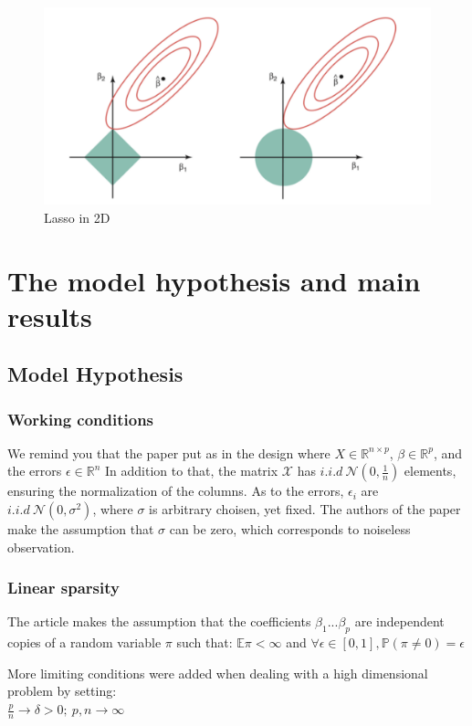 \documentclass[10pt,onecolumn,letterpaper]{article}
\begin{document}
\begin{figure}[!htbp]
   \begin{center}
	\includegraphics[width=0.5\linewidth]{lasso2d}
   \caption{Lasso in 2D}
   \label{fig:lasso}
   \end{center}
\end{figure}


\section{The model hypothesis and main results}

\subsection{Model Hypothesis }

\subsubsection{Working conditions}

We remind you that the paper put as in the design where $X \in \mathbb{R}^{n \times p}$, $ \beta \in \mathbb{R}^p$, and the errors $\epsilon \in \mathbb{R}^n$ 
In addition to that, the matrix \textbf{$\mathcal{X}$} has $i.i.d~\mathcal{N}(0,\frac{1}{n})$ elements, ensuring the normalization of the columns. As to the errors, $\epsilon_i$ are $i.i.d~\mathcal{N}(0,\sigma^2)$, where $\sigma$ is arbitrary choisen, yet fixed. The authors of the paper make the assumption that $\sigma$ can be zero, which corresponds to noiseless observation.


\subsubsection{Linear sparsity}
The article makes the assumption that the coefficients $\beta_1 ... \beta_p $ are independent copies of a random variable $\pi$ such that: $\mathbb{E}\pi < \infty $ and $\forall \epsilon \in \left[0,1\right], \mathbb{P}(\pi \neq 0) = \epsilon$

More limiting conditions were added when dealing with a high dimensional problem by setting:\\
 $\frac{p}{n} \to  \delta > 0; ~ p,n \to \infty$
\end{document}
